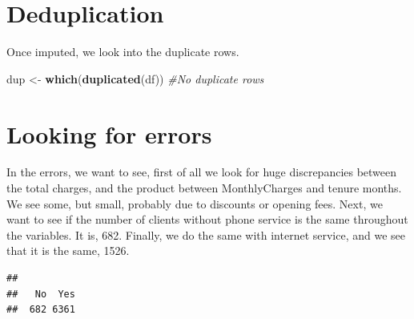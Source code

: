\documentclass[
]{article}
\newenvironment{Shaded}{\begin{snugshade}}{\end{snugshade}}
\newcommand{\CommentTok}[1]{\textcolor[rgb]{0.56,0.35,0.01}{\textit{#1}}}
\newcommand{\FunctionTok}[1]{\textcolor[rgb]{0.13,0.29,0.53}{\textbf{#1}}}
\newcommand{\NormalTok}[1]{#1}
\newcommand{\OtherTok}[1]{\textcolor[rgb]{0.56,0.35,0.01}{#1}}
\newcommand{\SpecialCharTok}[1]{\textcolor[rgb]{0.81,0.36,0.00}{\textbf{#1}}}
\begin{document}
\hypertarget{deduplication}{%
\section{Deduplication}\label{deduplication}}

Once imputed, we look into the duplicate rows.

\begin{Shaded}
\begin{Highlighting}[]
\NormalTok{dup }\OtherTok{\textless{}{-}} \FunctionTok{which}\NormalTok{(}\FunctionTok{duplicated}\NormalTok{(df)) }\CommentTok{\#No duplicate rows}
\end{Highlighting}
\end{Shaded}

\hypertarget{looking-for-errors}{%
\section{Looking for errors}\label{looking-for-errors}}

In the errors, we want to see, first of all we look for huge
discrepancies between the total charges, and the product between
MonthlyCharges and tenure months. We see some, but small, probably due
to discounts or opening fees. Next, we want to see if the number of
clients without phone service is the same throughout the variables. It
is, 682. Finally, we do the same with internet service, and we see that
it is the same, 1526.

\begin{Shaded}
\end{Shaded}

\begin{verbatim}
## 
##   No  Yes 
##  682 6361
\end{verbatim}

\begin{Shaded}
\end{Shaded}
\end{document}
